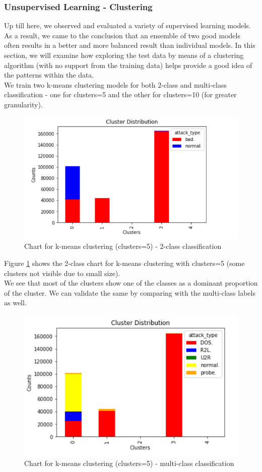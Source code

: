 \subsubsection{Unsupervised Learning - Clustering}
Up till here, we observed and evaluated a variety of supervised learning models. As a result, we came to the conclusion that an ensemble of two good models often results in a better and more balanced result than individual models. In this section, we will examine how exploring the test data by means of a clustering algorithm (with no support from the training data) helps provide a good idea of the patterns within the data.\\
We train two k-means clustering models for both 2-class and multi-class classification - one for clusters=5 and the other for clusters=10 (for greater granularity). \\
\begin{figure}
	\includegraphics[width=1.0\columnwidth]{images/cluster52graph.PNG}
	\caption{Chart for k-means clustering (clusters=5) - 2-class classification}
	\label{F:cg52}
\end{figure}
Figure \ref{F:cg52} shows the 2-class chart for k-means clustering with clusters=5 (some clusters not visible due to small size).\\
We see that most of the clusters show one of the classes as a dominant proportion of the cluster. We can validate the same by comparing with the multi-class labels as well.\\
\begin{figure}
	\includegraphics[width=1.0\columnwidth]{images/cluster5allgraph.PNG}
	\caption{Chart for k-means clustering (clusters=5) - multi-class classification}
	\label{F:cg5all}
\end{figure}
